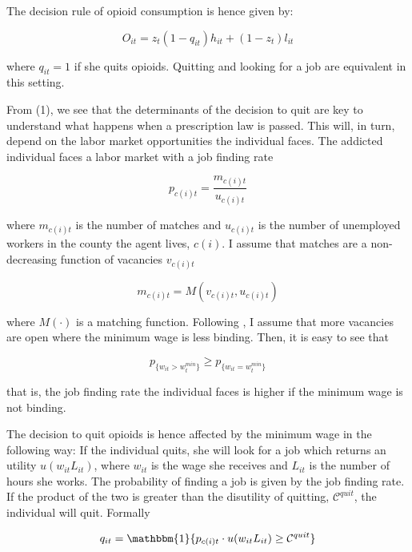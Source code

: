 \documentclass[12pt,a4paper]{article}
\begin{document}
The decision rule of opioid consumption is hence given by:

\begin{equation}
    O_{it} = z_{t}\left(1-q_{it}\right)h_{it} + (1-z_{t})l_{it}
\end{equation}

where \(q_{it} = 1\) if she quits opioids. 
Quitting and looking for a job are equivalent in this setting.

From (1), we see that the determinants of the decision to quit are key to understand what happens when a prescription law is passed.
This will, in turn, depend on the labor market opportunities the individual faces.
The addicted individual faces a labor market with a job finding rate

\begin{equation}
    p_{c(i)t} = \dfrac{m_{c(i)t}}{u_{c(i)t}}
\end{equation}

where \(m_{c(i)t}\) is the number of matches and \(u_{c(i)t}\) is the number of unemployed workers in the county the agent lives, \(c(i)\). 
I assume that matches are a non-decreasing function of vacancies \(v_{c(i)t}\)

\begin{equation}
    m_{c(i)t} = M(v_{c(i)t}, u_{c(i)t})
\end{equation}

where \(M\left(\cdot \right) \) is a matching function. 
Following \textcite{Flinn2010}, I assume that more vacancies are open where the minimum wage is less binding. 
Then, it is easy to see that

\begin{equation}
    p_{\{w_{it} > w^{min}_t\}} \geq p_{\{w_{it} = w^{min}_t\}}
\end{equation}

that is, the job finding rate the individual faces is higher if the minimum wage is not binding.

The decision to quit opioids is hence affected by the minimum wage in the following way:
If the individual quits, she will look for a job which returns an utility \(u(w_{it}L_{it})\), where \(w_{it}\) is the wage she receives and \(L_{it}\) is the number of hours she works.
The probability of finding a job is given by the job finding rate.
If the product of the two is greater than the disutility of quitting, \(\mathcal{C}^{quit}\), the individual will quit.
Formally

\begin{equation}
    q_{it}  = \mathbbm{1}\{p_{{c(i)t}} \cdot u(w_{it}L_{it}) \geq \mathcal{C}^{quit}\}
\end{equation}
\end{document}
